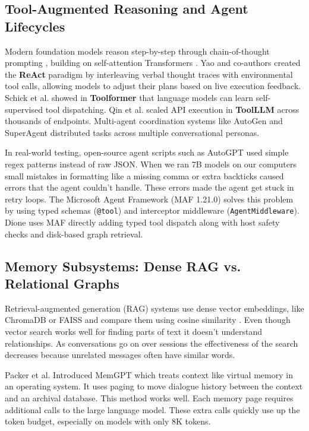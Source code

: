 \documentclass[conference,a4paper]{IEEEtran}
\begin{document}
\subsection{Tool-Augmented Reasoning and Agent Lifecycles}
Modern foundation models reason step-by-step through chain-of-thought prompting \cite{wei2022chain}, building on self-attention Transformers \cite{vaswani2017attention}. Yao and co-authors created the \textbf{ReAct} paradigm \cite{yao2023react} by interleaving verbal thought traces with environmental tool calls, allowing models to adjust their plans based on live execution feedback. Schick et al. showed in \textbf{Toolformer} \cite{schick2023toolformer} that language models can learn self-supervised tool dispatching. Qin et al. scaled API execution in \textbf{ToolLLM} \cite{qin2023toolllm} across thousands of endpoints. Multi-agent coordination systems like AutoGen \cite{dibia2023autogen} and SuperAgent \cite{malsuare2024superagent} distributed tasks across multiple conversational personas.

In real-world testing, open-source agent scripts such as AutoGPT \cite{liu2023agentbench} used simple regex patterns instead of raw JSON. When we ran 7B models on our computers small mistakes in formatting like a missing comma or extra backticks caused errors that the agent couldn't handle. These errors made the agent get stuck in retry loops. The Microsoft Agent Framework (MAF 1.21.0) \cite{microsoft2025agentframework} solves this problem by using typed schemas (\texttt{@tool}) and interceptor middleware (\texttt{AgentMiddleware}). Dione uses MAF directly adding typed tool dispatch along with host safety checks and disk-based graph retrieval.

\subsection{Memory Subsystems: Dense RAG vs. Relational Graphs}
Retrieval-augmented generation (RAG) systems use dense vector embeddings, like ChromaDB or FAISS and compare them using cosine similarity \cite{lewis2020retrieval}. Even though vector search works well for finding parts of text it doesn't understand relationships. As conversations go on over sessions the effectiveness of the search decreases because unrelated messages often have similar words.

Packer et al. Introduced MemGPT \cite{packer2023memgpt} which treats context like virtual memory in an operating system. It uses paging to move dialogue history between the context and an archival database. This method works well. Each memory page requires additional calls to the large language model. These extra calls quickly use up the token budget, especially on models with only 8K tokens.
\end{document}
